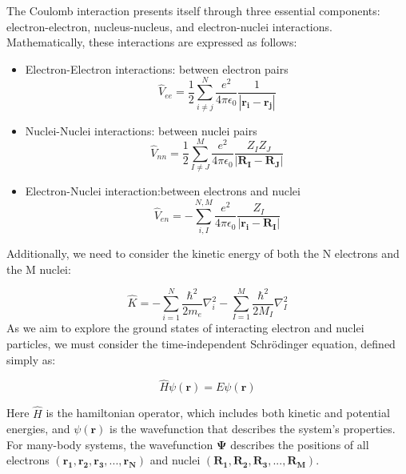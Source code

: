 The Coulomb interaction presents itself through three essential components: electron-electron, nucleus-nucleus, and electron-nuclei interactions. Mathematically, these interactions are expressed as follows:
\begin{itemize}
    \item Electron-Electron interactions: between electron pairs
    \begin{equation} \label{eq_1}
        \hat{V}_{ee} = \dfrac{1}{2}\sum_{i\neq j }^{N}\dfrac{e^{2}}{4\pi\epsilon_{0} }\dfrac{1}{|\mathbf{r_i}-\mathbf{r_j}|}
    \end{equation}
    \item Nuclei-Nuclei interactions: between nuclei pairs
    \begin{equation} \label{eq_2}
        \hat{V}_{nn} = \dfrac{1}{2}\sum_{I\neq J }^{M}\dfrac{e^{2}}{4\pi\epsilon_{0}}\dfrac{Z_I Z_J}{|\mathbf{R_I}-\mathbf{R_J}|}  
    \end{equation}
    \item Electron-Nuclei interaction:between electrons and nuclei 
    \begin{equation} \label{eq_3}
        \hat{V}_{en} = -\sum_{i,I }^{N,M}\dfrac{e^{2}}{4\pi\epsilon_{0}}\dfrac{Z_I}{|\mathbf{r_i}-\mathbf{R_I}|}  
    \end{equation}
\end{itemize}
Additionally, we need to consider the kinetic energy of both the N electrons and the M nuclei:

\begin{equation} \label{eq_4}
    \hat{K} = - \sum_{i=1}^{N} \dfrac{\hbar^{2}}{2m_e} \nabla_{i}^{2}-\sum_{I=1}^{M}\dfrac{\hbar^{2}}{2M_{I}}\nabla_{I}^{2} 
\end{equation}
As we aim to explore the ground states of interacting electron and nuclei particles, we must consider the time-independent Schrödinger equation, defined simply as:

\begin{equation} \label{eqn5}
	\hat{H} \psi(\mathbf{r})= E \psi (\mathbf{r})
\end{equation}

Here $\hat{H}$  is the hamiltonian operator, which includes both kinetic and potential energies, and $\psi(\mathbf{r})$ is the wavefunction that describes the system's properties. For many-body systems, the wavefunction $\mathbf{\Psi}$ describes the positions of all electrons $\left( \mathbf{r_1}, \mathbf{r_2}, \mathbf{r_3}, ...,  \mathbf{r_N} \right)$ and nuclei $\left( \mathbf{R_1}, \mathbf{R_2}, \mathbf{R_3}, ...,  \mathbf{R_M} \right)$. 

